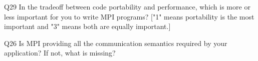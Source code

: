 \begin{description}%
\item{Q29} In the tradeoff between code portability and performance, which is more or less important for you to write MPI programs? ["1" means portability is the most important and "3" means both are equally important.]%
\item{Q26} Is MPI providing all the communication semantics required by your application? If not, what is missing?%
\end{description}%
